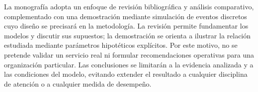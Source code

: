 La monografía adopta un enfoque de revisión bibliográfica y análisis comparativo, complementado con una demostración mediante simulación de eventos discretos cuyo diseño se precisará en la metodología. La revisión permite fundamentar los modelos y discutir sus supuestos; la demostración se orienta a ilustrar la relación estudiada mediante parámetros hipotéticos explícitos. Por este motivo, no se pretende validar un servicio real ni formular recomendaciones operativas para una organización particular. Las conclusiones se limitarán a la evidencia analizada y a las condiciones del modelo, evitando extender el resultado a cualquier disciplina de atención o a cualquier medida de desempeño.
